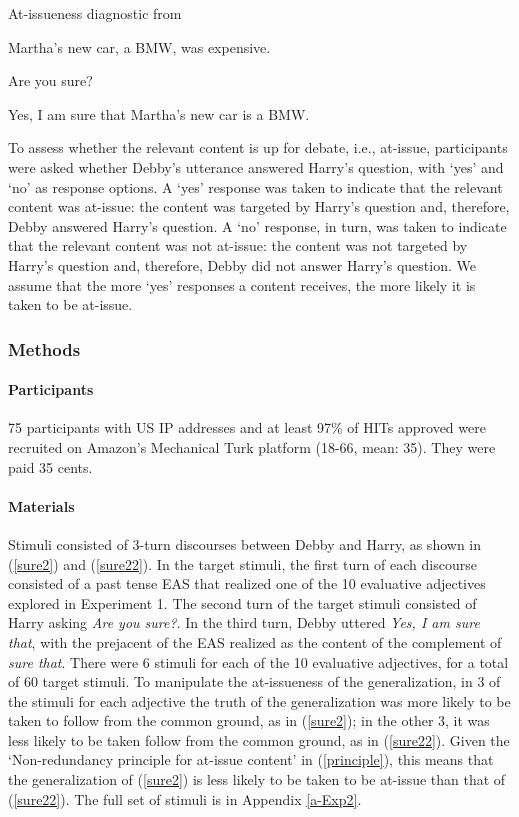 \documentclass[11pt,fleqn]{article}
\newcommand{\6}{\mbox{$[\hspace*{-.6mm}[$}}
\newcommand{\9}{\mbox{$]\hspace*{-.6mm}]$}}
\begin{document}
\begin{exe}
\ex\label{sure} At-issueness diagnostic from \citealt{tbd-variability}
\begin{xlist}
 Martha's new car, a BMW, was expensive.

 Are you sure?
	
 Yes, I am sure that Martha's new car is a BMW. 
\end{xlist}
\end{exe}
To assess whether the relevant content is up for debate, i.e., at-issue, participants were asked whether Debby's utterance answered Harry's question, with `yes' and `no' as response options. A `yes' response was taken to indicate that the relevant content was at-issue: the content was targeted by Harry's question and, therefore, Debby answered Harry's question. A `no' response, in turn, was taken to indicate that the relevant content was not at-issue: the content was not targeted by Harry's question and, therefore, Debby did not answer Harry's question. We assume that the more `yes' responses a content receives, the more likely it is taken to be at-issue.

\subsubsection{Methods}

\paragraph{Participants} 75 participants with US IP addresses and at least 97\% of HITs approved were recruited on Amazon's Mechanical Turk platform (18-66, mean: 35). They were paid 35 cents.

\paragraph{Materials} Stimuli consisted of 3-turn discourses between Debby and Harry, as shown in (\ref{sure2}) and (\ref{sure22}). In the target stimuli, the first turn of each discourse consisted of a past tense EAS that realized one of the 10 evaluative adjectives explored in Experiment 1. The second turn of the target stimuli consisted of Harry asking {\em Are you sure?}. In the third turn, Debby uttered {\em Yes, I am sure that}, with the prejacent of the EAS realized as the content of the complement of {\em sure that}. There were 6 stimuli for each of the 10 evaluative adjectives, for a total of 60 target stimuli. To manipulate the at-issueness of the generalization, in 3 of the stimuli for each adjective the truth of the generalization was more likely to be taken to follow from the common ground, as in (\ref{sure2}); in the other 3, it was less likely to be taken follow from the common ground, as in (\ref{sure22}). Given the `Non-redundancy principle for at-issue content' in (\ref{principle}), this means that the generalization of (\ref{sure2}) is less likely to be taken to be at-issue than that of (\ref{sure22}).  The full set of stimuli is in Appendix \ref{a-Exp2}. 
\end{document}
